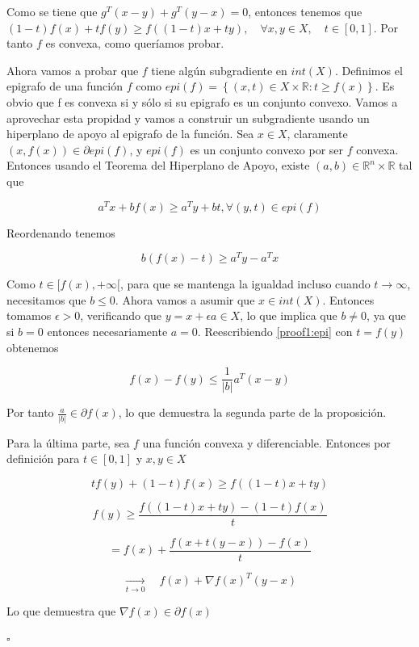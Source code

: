 Como se tiene que $g^T(x-y) + g^T(y-x)=0$, entonces tenemos que $(1-t)f(x) + tf(y) \geq f((1-t)x + ty), \quad \forall x,y \in X, \quad t \in [0,1]$. Por tanto $f$ es convexa, como queríamos probar.

Ahora vamos a probar que $f$ tiene algún subgradiente en $int(X)$. Definimos el epigrafo de una función $f$ como $epi(f)=\left \{ (x,t) \in X \times \mathbb{R} : t \geq f(x) \right \}$. Es obvio que f es convexa si y sólo si su epigrafo es un conjunto convexo. Vamos a aprovechar esta propidad y vamos a construir un subgradiente usando un hiperplano de apoyo al epigrafo de la función. Sea $x \in X$, claramente $(x, f(x)) \in \partial epi(f)$, y $epi(f)$ es un conjunto convexo por ser $f$ convexa. Entonces usando el Teorema del Hiperplano de Apoyo, existe $(a,b) \in \mathbb{R}^n \times \mathbb{R}$ tal que

\begin{equation}\label{proof1:epi}
    a^Tx + bf(x) \geq a^Ty + bt, \forall (y,t) \in epi(f)
\end{equation}

Reordenando tenemos

$$b(f(x)-t) \geq a^Ty - a^Tx$$

Como $t \in [f(x), + \infty [$, para que se mantenga la igualdad incluso cuando $t \rightarrow \infty$, necesitamos que $b\leq 0$. Ahora vamos a asumir que $x \in int(X)$. Entonces tomamos $\epsilon > 0$, verificando que $y=x+\epsilon a \in X$, lo que implica que $b\neq 0$, ya que si $b=0$ entonces necesariamente $a=0$. Reescribiendo \ref{proof1:epi} con $t=f(y)$ obtenemos

$$f(x) - f(y) \leq \frac{1}{|b|} a^T (x-y)$$

Por tanto $\frac{a}{|b|} \in \partial f(x)$, lo que demuestra la segunda parte de la proposición.

Para la última parte, sea $f$ una función convexa y diferenciable. Entonces por definición para $t \in [0,1]$ y $x,y \in X$

$$tf(y) + (1-t)f(x) \geq f((1-t)x + ty)$$

$$f(y) \geq \frac{f((1-t)x + ty) - (1-t)f(x)}{t}$$

$$= f(x) + \frac{f(x + t(y-x)) - f(x)}{t}$$

$$ \xrightarrow[t \rightarrow 0]{} \quad f(x) + \nabla f(x)^T (y-x)$$

Lo que demuestra que $\nabla f(x) \in \partial f(x)$


\begin{flushright}
    $\square$
\end{flushright} 




